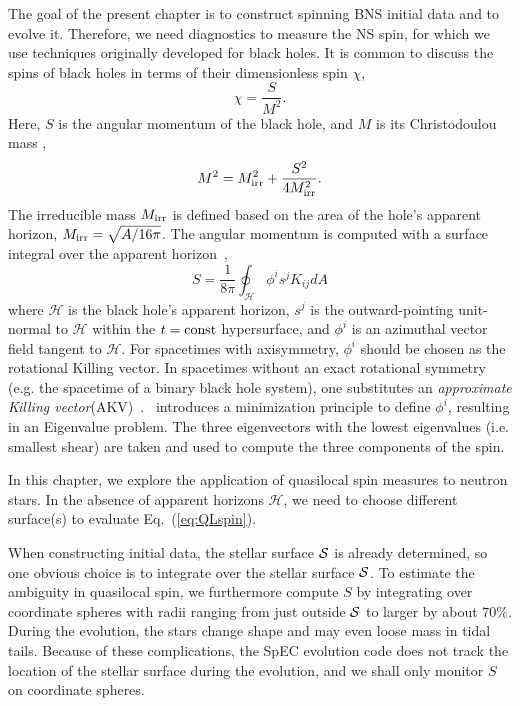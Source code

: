 The goal of the present chapter is to construct spinning BNS initial data and to evolve it.
Therefore, we need diagnostics to measure the NS spin, for which we use techniques originally developed for black holes.
It is common to discuss the spins of black holes in terms of their
dimensionless spin $\chi$,
\begin{equation}\label{eq:chi}
\chi = \frac{S}{M^2}.
\end{equation}
Here, $S$ is the angular momentum of the black hole, and $M$ is its
Christodoulou mass \citep{Christodoulou70},
\begin{equation}\label{eq:ChristodoulouMass}
M^2 = M_{\rm irr}^2 + \frac{S^2}{4M_{\rm irr}^2}.
\end{equation}
The irreducible mass $M_{\rm irr}$ is defined based on the area of the
hole's apparent horizon, $M_{\rm irr}=\sqrt{A/16\pi}$. The angular
momentum is computed with a surface integral over the apparent
horizon~\citep{BrownYork1993,Ashtekar2001,Ashtekar2003},
\begin{equation}\label{eq:QLspin}
S= \frac{1}{8\pi}\oint_{\mathcal{H}}\phi^is^jK_{ij}dA
\end{equation}
where $\mathcal{H}$ is the black hole's apparent horizon, $s^j$ is the
outward-pointing unit-normal to $\mathcal{H}$ within the $t={\rm const}$
hypersurface, and $\phi^i$ is an azimuthal vector field tangent to
$\mathcal{H}$. For spacetimes with axisymmetry, $\phi^i$ should be
chosen as the rotational Killing vector. In spacetimes without an
exact rotational symmetry (e.g. the spacetime of a binary black hole
system), one substitutes an {\it approximate Killing
  vector}(AKV)~\citep{Cook2007,Lovelace2008}.~\cite{Lovelace2008}
introduces a minimization principle to define $\phi^i$, resulting in
an Eigenvalue problem. The three eigenvectors with the lowest
eigenvalues (i.e. smallest shear) are taken and used to compute
the three components of the spin.

In this chapter, we explore the application of quasilocal spin measures
to neutron stars. In the absence of apparent horizons $\mathcal{H}$,
we need to choose different surface(s) to evaluate Eq.~(\ref{eq:QLspin}). 

When constructing initial data, the stellar surface ${\cal S}$ is
already determined, so one obvious choice is to integrate over the
stellar surface ${\cal S}$. To estimate the ambiguity in quasilocal
spin, we furthermore compute $S$ by integrating over coordinate
spheres with radii ranging from just outside ${\cal S}$ to larger by
about $70\%$. During the evolution, the stars change shape and
may even loose mass in tidal tails. Because of these complications,
the SpEC evolution code does not track the location of the
stellar surface during the evolution, and we shall only
monitor $S$ on coordinate spheres.

